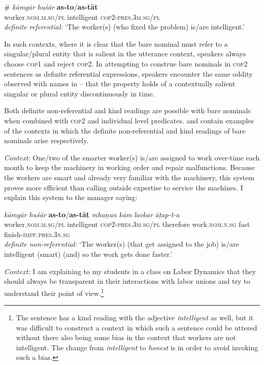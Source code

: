 \documentclass[output=paper,hidelinks]{langscibook}
\begin{document}
\begin{exe}
\begin{xlist}
\begin{xlist}
\begin{exe}
\gll \# \emph{kāmgār} \emph{hu\'{s}ār} \textbf{as-to}/\textbf{as-tāt}\\
{} worker.\textsc{nom.m.sg}/\textsc{pl} intelligent \textsc{cop2-pres.3m.sg}/\textsc{pl}\\
\glt \emph{definite referential:} `The worker(s) (who fixed the problem) is/are intelligent.' \label{inst}
 \z

In such contexts, where it is clear that the bare nominal must refer to a singular/plural entity that is salient in the utterance context, speakers always choose \textsc{cop1} and reject \textsc{cop2}. In attempting to construe bare nominals in \textsc{cop2} sentences as definite referential expressions, speakers encounter the same oddity observed with names in  -- that the property holds of a contextually salient singular or plural entity discontinuously in time.

Both definite non-referential and kind readings are possible with bare nominals when combined with \textsc{cop2} and individual level predicates.
 and  contain examples of the contexts in which the definite non-referential and kind readings of bare nominals arise respectively.

\begin{exe}

\ex \textit{Context:} One/two of the smarter worker(s) is/are assigned to work over-time each month to keep the machinery in working order and repair malfunctions. Because the workers are smart and already very familiar with the machinery, this system proves more efficient than calling outside expertise to service the machines. I explain this system to the manager saying:

\gll \emph{kāmgār} \emph{hu\'{s}ār} \textbf{as-to}/\textbf{as-tāt} \emph{mhaṇun} \emph{kām} \emph{lavkar} \emph{āṭap-t-a}\\
worker.\textsc{nom.m.sg}/\textsc{pl} intelligent \textsc{cop2-pres.3m.sg}/\textsc{pl} therefore work.\textsc{nom.n.sg} fast finish-\textsc{impf.pres.3n.sg}\\
\glt \emph{definite non-referential:} `The worker(s) (that get assigned to the job) is/are intelligent (smart) (and) so the work gets done faster.' \label{indworker2}
\z
{}

\pagebreak

\begin{exe}

\ex \textit{Context:}
 I am explaining to my students in a class on Labor Dynamics that they should always be transparent in their interactions with labor unions and try to understand their point of view.\footnote{The sentence has a kind reading with the adjective \emph{intelligent} as well, but it was difficult to construct a context in which such a sentence could be uttered without there also being some bias in the context that workers are not intelligent. The change from \emph{intelligent} to \emph{honest} is in order to avoid invoking such a bias.}


\end{exe}
\end{exe}
\end{exe}
\end{xlist}
\end{xlist}
\end{exe}
\end{document}
